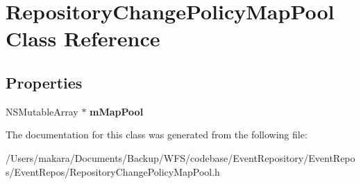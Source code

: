 \hypertarget{interface_repository_change_policy_map_pool}{
\section{\-Repository\-Change\-Policy\-Map\-Pool \-Class \-Reference}
\label{interface_repository_change_policy_map_pool}
}
\subsection*{\-Properties}
\begin{DoxyCompactItemize}
\item 
\hypertarget{interface_repository_change_policy_map_pool_a8a136834695650fdfd4f3d6cae21215b}{
\-N\-S\-Mutable\-Array $\ast$ {\bfseries m\-Map\-Pool}}
\label{interface_repository_change_policy_map_pool_a8a136834695650fdfd4f3d6cae21215b}

\end{DoxyCompactItemize}


\-The documentation for this class was generated from the following file\-:\begin{DoxyCompactItemize}
\item 
/\-Users/makara/\-Documents/\-Backup/\-W\-F\-S/codebase/\-Event\-Repository/\-Event\-Repos/\-Event\-Repos/\-Repository\-Change\-Policy\-Map\-Pool.\-h\end{DoxyCompactItemize}
